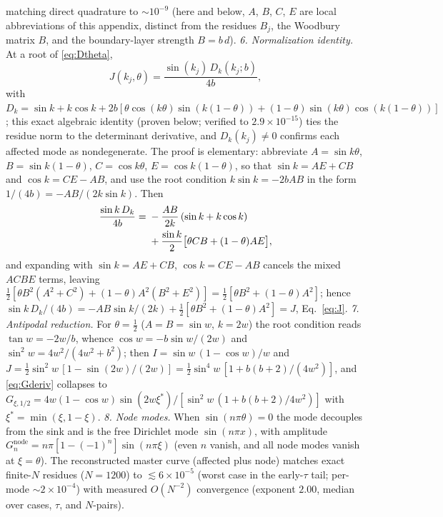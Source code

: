 \documentclass[reprint,amsmath,amssymb,aps,prresearch,longbibliography]{revtex4-2}
\begin{document}
matching direct quadrature to $\sim10^{-9}$ (here and below, $A$, $B$, $C$, $E$ are local
abbreviations of this appendix, distinct from the residues $B_j$, the Woodbury matrix $B$, and the
boundary-layer strength $B=b\,d$). \emph{6. Normalization identity.} At a root of
\eqref{eq:Dtheta},
\begin{equation}
J(k_j,\theta)=\frac{\sin(k_j)\,D_k(k_j;b)}{4b},
\label{eq:JD}
\end{equation}
with $D_k=\sin k+k\cos k+2b[\theta\cos(k\theta)\sin(k(1-\theta))+(1-\theta)\sin(k\theta)
\cos(k(1-\theta))]$; this exact algebraic identity (proven below; verified to $2.9\times10^{-15}$)
ties the residue norm to the determinant derivative, and $D_k(k_j)\neq0$ confirms each affected mode
as nondegenerate. The proof is elementary: abbreviate $A=\sin k\theta$, $B=\sin k(1-\theta)$,
$C=\cos k\theta$, $E=\cos k(1-\theta)$, so that $\sin k=AE+CB$ and $\cos k=CE-AB$, and use the root
condition $k\sin k=-2bAB$ in the form $1/(4b)=-AB/(2k\sin k)$. Then
\begin{align}
\frac{\sin k\,D_k}{4b}={}&-\frac{AB}{2k}\,(\sin k+k\cos k)\notag\\
&+\frac{\sin k}{2}\big[\theta CB+(1-\theta)AE\big],\notag
\end{align}
and expanding with $\sin k=AE+CB$, $\cos k=CE-AB$ cancels the mixed $ACBE$ terms, leaving
$\tfrac12[\theta B^2(A^2{+}C^2)+(1-\theta)A^2(B^2{+}E^2)]=\tfrac12[\theta B^2+(1-\theta)A^2]$; hence
$\sin k\,D_k/(4b)=-AB\sin k/(2k)+\tfrac12[\theta B^2+(1-\theta)A^2]=J$, Eq.~\eqref{eq:J}.
\emph{7. Antipodal reduction.} For $\theta=\tfrac12$ ($A=B=\sin w$, $k=2w$) the root condition reads
$\tan w=-2w/b$, whence $\cos w=-b\sin w/(2w)$ and $\sin^2w=4w^2/(4w^2+b^2)$; then
$I=\sin w\,(1-\cos w)/w$ and
$J=\tfrac12\sin^2w\,[1-\sin(2w)/(2w)]=\tfrac12\sin^4w\,[1+b(b+2)/(4w^2)]$, and \eqref{eq:Gderiv}
collapses to
$G_{\xi,1/2}=4w(1-\cos w)\sin(2w\xi^*)/[\sin^2 w\,(1+b(b+2)/4w^2)]$ with $\xi^*=\min(\xi,1-\xi)$. \emph{8. Node modes.} When $\sin(n\pi\theta)=0$
the mode decouples from the sink and is the free Dirichlet mode $\sin(n\pi x)$, with amplitude
$G_n^{\mathrm{node}}=n\pi[1-(-1)^n]\sin(n\pi\xi)$ (even $n$ vanish, and all node modes vanish at
$\xi=\theta$). The reconstructed master curve (affected plus node) matches exact finite-$N$ residues
($N=1200$) to
$\lesssim6\times10^{-5}$ (worst case in the early-$\tau$ tail; per-mode $\sim2\times10^{-4}$) with
measured $O(N^{-2})$ convergence (exponent $2.00$, median over cases, $\tau$, and $N$-pairs).
\end{document}
